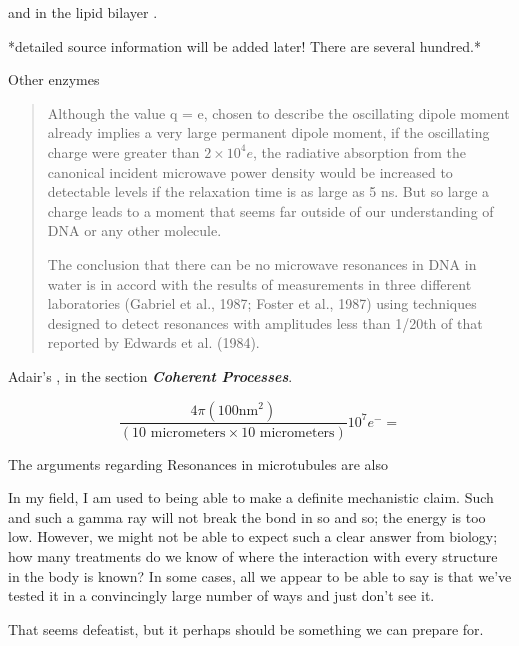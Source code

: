 \documentclass[paper.tex]{subfiles}
\begin{document}
and in the lipid bilayer \cite{Lipid2015} \footnotemark.


*detailed source information will be added later! There are several hundred.*



Other enzymes

\cite{Vibrational2002}
\begin{quote}
Although the value q = e, chosen to describe the oscillating dipole moment already implies a very large permanent dipole moment, if the oscillating charge were greater
than $2\times 10^4 e$, the radiative absorption from the canonical
incident microwave power density would be increased to
detectable levels if the relaxation time is as large as 5 ns.
But so large a charge leads to a moment that seems far
outside of our understanding of DNA or any other molecule.


The conclusion that there can be no microwave resonances in DNA in water is in accord with the results of
measurements in three different laboratories (Gabriel et al.,
1987; Foster et al., 1987) using techniques designed to
detect resonances with amplitudes less than 1/20th of that
reported by Edwards et al. (1984).
\end{quote}

Adair's \cite{Vibrational2002}, in the section {\it \bf Coherent Processes}. 

$$\frac{4 \pi (100 \text{nm}^2)}{(10 \text{ micrometers} \times 10 \text{ micrometers})} 10^7 e^- = $$

The arguments regarding Resonances in microtubules are also 




In my field, I am used to being able to make a definite mechanistic claim. Such and such a gamma ray will not break the bond in so and so; the energy is too low. However, we might not be able to expect such a clear answer from biology; how many treatments do we know of where the interaction with every structure in the body is known? In some cases, all we appear to be able to say is that we've tested it in a convincingly large number of ways and just don't see it.

That seems defeatist, but it perhaps should be something we can prepare for.


\cite{Identification2018}
\end{document}
